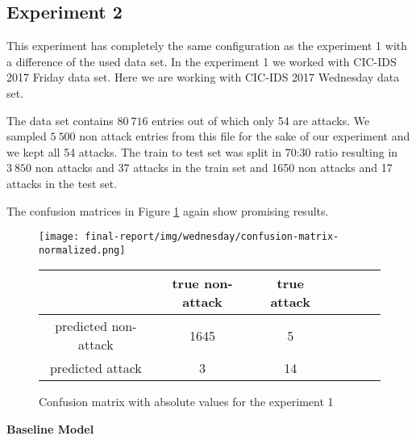 \documentclass{article}
\begin{document}


\subsection{Experiment 2}
This experiment has completely the same configuration as the experiment 1 with a difference of the used data set. In the experiment 1 we worked with CIC-IDS 2017 Friday data set. Here we are working with CIC-IDS 2017 Wednesday data set.

The data set contains $80\ 716$ entries out of which only 54 are attacks. We sampled $5\ 500$ non attack entries from this file for the sake of our experiment and we kept all 54 attacks. The train to test set was split in 70:30 ratio resulting in $3\ 850$ non attacks and 37 attacks in the train set and 1650 non attacks and 17 attacks in the test set.

The confusion matrices in Figure \ref{fig-exp2-transcriptions} again show promising results.

\begin{figure}[h!]
    \centering
    \texttt{[image: final-report/img/wednesday/confusion-matrix-normalized.png]}

    \centering
    \begin{tabular}{ |c|c|c|c|c|c|c| }
     \hline
      & true non-attack & true attack \\
     \hline
     predicted non-attack & 1645 & 5 \\
     \hline
     predicted attack & 3 & 14 \\
     \hline
    \end{tabular}
    \caption{Confusion matrix with absolute values for the experiment 1}
    \label{fig-exp2-transcriptions}
\end{figure}


\vspace{0.5cm}
\noindent\textbf{Baseline Model}

\end{document}

